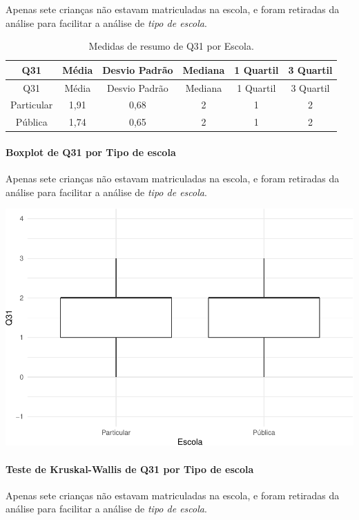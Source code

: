 \documentclass[]{article}
\let\oldparagraph\paragraph
\renewcommand{\paragraph}[1]{\oldparagraph{#1}\mbox{}}
\begin{document}
Apenas sete crianças não estavam matriculadas na escola, e foram retiradas da análise para facilitar a análise de \emph{tipo de escola}.

\begin{longtable}[]{@{}cccccc@{}}
\caption{\label{tab:unnamed-chunk-1059}Medidas de resumo de Q31 por Escola.}\tabularnewline
\toprule
Q31 & Média & Desvio Padrão & Mediana & 1 Quartil & 3 Quartil\tabularnewline
\midrule
\endfirsthead
\toprule
Q31 & Média & Desvio Padrão & Mediana & 1 Quartil & 3 Quartil\tabularnewline
\midrule
\endhead
Particular & 1,91 & 0,68 & 2 & 1 & 2\tabularnewline
Pública & 1,74 & 0,65 & 2 & 1 & 2\tabularnewline
\bottomrule
\end{longtable}

\hypertarget{boxplot-de-q31-por-tipo-de-escola}{%
\paragraph{Boxplot de Q31 por Tipo de escola}\label{boxplot-de-q31-por-tipo-de-escola}}

Apenas sete crianças não estavam matriculadas na escola, e foram retiradas da análise para facilitar a análise de \emph{tipo de escola}.

\begin{center}\includegraphics[width=0.75\linewidth]{relatorio_covid19_files/figure-latex/unnamed-chunk-1060-1} \end{center}

\hypertarget{teste-de-kruskal-wallis-de-q31-por-tipo-de-escola}{%
\paragraph{Teste de Kruskal-Wallis de Q31 por Tipo de escola}\label{teste-de-kruskal-wallis-de-q31-por-tipo-de-escola}}

Apenas sete crianças não estavam matriculadas na escola, e foram retiradas da análise para facilitar a análise de \emph{tipo de escola}.
\end{document}
